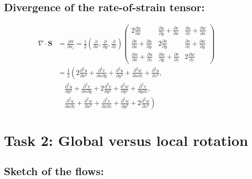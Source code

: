 \documentclass{article}
\begin{document}
\subsection{Divergence of the rate-of-strain tensor:}
    \begin{equation}
        \begin{aligned}
        \nabla \cdot \mathbf{S} &= \frac{\partial S}{\partial x_i} = \frac{1}{2} \left(\frac{\partial}{\partial x}, \frac{\partial}{\partial y}, \frac{\partial}{\partial z}\right) \begin{pmatrix} 
        2 \frac{\partial u}{\partial x} & \frac{\partial u}{\partial y} + \frac{\partial v}{\partial x} & \frac{\partial u}{\partial z} + \frac{\partial w}{\partial x} \\
        \frac{\partial v}{\partial x} + \frac{\partial u}{\partial y} & 2 \frac{\partial v}{\partial y} & \frac{\partial v}{\partial z} + \frac{\partial w}{\partial y} \\
        \frac{\partial w}{\partial x} + \frac{\partial u}{\partial z} & \frac{\partial w}{\partial y} + \frac{\partial v}{\partial z} & 2 \frac{\partial w}{\partial z}
        \end{pmatrix} \\
        &= \frac{1}{2}\left(2\frac{\partial^2 u}{\partial x^2} + \frac{\partial^2 v}{\partial x \partial y} + \frac{\partial^2 u}{\partial y^2} + \frac{\partial^2 w}{\partial x \partial z} + \frac{\partial^2 u}{\partial z^2}, \right. \\
        &\quad \left. \frac{\partial^2 u}{\partial y^2} + \frac{\partial^2 v}{\partial x \partial y} + 2 \frac{\partial^2 v}{\partial y^2} + \frac{\partial^2 w}{\partial y^2} + \frac{\partial^2 v}{\partial y \partial z}, \right. \\
        &\quad \left. \frac{\partial^2 u}{\partial x \partial z} + \frac{\partial^2 w}{\partial x^2} + \frac{\partial^2 v}{\partial x \partial z} + \frac{\partial^2 w}{\partial y^2} + 2 \frac{\partial^2 w}{\partial z^2}\right)
        \end{aligned}
        \end{equation}


\newpage
\section{Task 2: Global versus local rotation}

\subsection{Sketch of the flows:}
\end{document}
